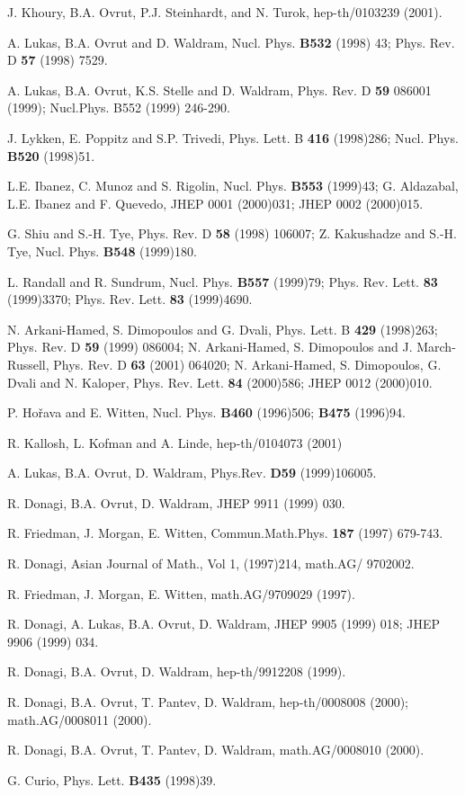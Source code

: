 \documentclass[a4paper,12pt]{article}
\numberwithin{equation}{section}
\theoremstyle{plain}
\begin{document}
\begin{thebibliography}{9999}

 J. Khoury, B.A. Ovrut, P.J. Steinhardt, and N. Turok,
hep-th/0103239 (2001).

 A. Lukas, B.A. Ovrut and D. Waldram, Nucl. Phys. {\bf B532
\rm}(1998) 43; Phys. Rev. D {\bf 57 \rm} (1998) 7529. 

 A. Lukas, B.A. Ovrut, K.S. 
Stelle and D. Waldram, Phys. Rev. D {\bf 59 \rm} 086001 (1999);
Nucl.Phys. B552 (1999) 246-290.

 J. Lykken, E. Poppitz and S.P. Trivedi, Phys. Lett. B 
{\bf 416 \rm}(1998)286;  Nucl. Phys. {\bf B520 \rm} (1998)51.

 L.E. Ibanez, C. Munoz and S. Rigolin, Nucl. Phys. {\bf B553 \rm}
(1999)43; G. Aldazabal, L.E. Ibanez and F. Quevedo, JHEP 0001 (2000)031;
JHEP 0002 (2000)015.

 G. Shiu and S.-H. Tye, Phys. Rev. D {\bf 58 \rm} (1998) 106007;
Z. Kakushadze and S.-H. Tye, Nucl. Phys. {\bf B548 \rm} (1999)180.

 L. Randall and R. Sundrum,  Nucl. Phys. {\bf B557 \rm} (1999)79;
Phys. Rev. Lett. {\bf 83 \rm} (1999)3370; Phys. Rev. Lett. {\bf 83 \rm}
(1999)4690.

 N. Arkani-Hamed, S. Dimopoulos and G. Dvali, Phys. Lett. B
{\bf 429 \rm}(1998)263; Phys. Rev. D {\bf 59 \rm} (1999) 086004; N. Arkani-Hamed,
S. Dimopoulos and J. March-Russell,  Phys. Rev. D {\bf 63 \rm} (2001) 064020;
N. Arkani-Hamed, S. Dimopoulos, G. Dvali and N. Kaloper,  Phys. Rev. Lett. 
{\bf 84 \rm}(2000)586; JHEP 0012 (2000)010.

 P. Ho\v rava and E. Witten, Nucl. Phys. {\bf B460 \rm} (1996)506;
{\bf B475 \rm} (1996)94.

 R. Kallosh, L. Kofman and  A. Linde, hep-th/0104073 (2001)

 A. Lukas, B.A. Ovrut, D. Waldram, Phys.Rev. {\bf D59
\rm}(1999)106005.

 R. Donagi, B.A. Ovrut, D. Waldram, JHEP 9911 (1999) 030.

 R. Friedman, J. Morgan, E. Witten, Commun.Math.Phys. {\bf 187
\rm} (1997) 679-743.

 R. Donagi, Asian Journal of Math., Vol 1, (1997)214, 
math.AG/ 9702002.

 R. Friedman, J. Morgan, E. Witten, math.AG/9709029 (1997).

 R. Donagi, A. Lukas, B.A. Ovrut, D. Waldram, JHEP 9905 (1999) 018;
JHEP 9906 (1999) 034. 

 R. Donagi, B.A. Ovrut, D. Waldram, hep-th/9912208 (1999).

 R. Donagi, B.A. Ovrut, T. Pantev, D. Waldram, hep-th/0008008
(2000); math.AG/0008011 (2000).

 R. Donagi, B.A. Ovrut, T. Pantev, D. Waldram, math.AG/0008010 (2000).

 G. Curio, Phys. Lett. {\bf B435 \rm} (1998)39.


\end{thebibliography}
\end{document}
